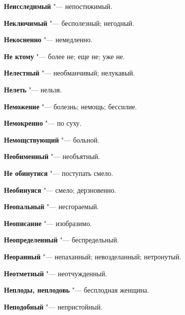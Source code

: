 \begin{mymulticols}{2}
\noindent\textbf{Неисследимый} "--- непостижимый. 




\noindent\textbf{Неключимый} "--- бесполезный; негодный. 




\noindent\textbf{Некосненно} "--- немедленно. 




\noindent\textbf{Не ктому} "--- более не; еще не; уже не. 




\noindent\textbf{Нелестный} "--- необманчивый; нелукавый. 




\noindent\textbf{Нелеть} "--- нельзя. 




\noindent\textbf{Неможение} "--- болезнь; немощь; бессилие. 




\noindent\textbf{Немокренно} "--- по суху. 




\noindent\textbf{Немощствующий} "--- больной. 




\noindent\textbf{Необименный} "--- необъятный. 




\noindent\textbf{Не обинутися} "--- поступать смело. 




\noindent\textbf{Необинуяся} "--- смело; дерзновенно. 




\noindent\textbf{Неопальный} "--- несгораемый. 




\noindent\textbf{Неописанне} "--- изобразимо. 




\noindent\textbf{Неопределенный} "--- беспредельный. 




\noindent\textbf{Неоранный} "--- непаханный; невозделанный; нетронутый. 




\noindent\textbf{Неотметный} "--- неотчужденный. 




\noindent\textbf{Неплоды, неплодовь} "--- бесплодная женщина. 




\noindent\textbf{Неподобный} "--- непристойный. 





\end{mymulticols}

